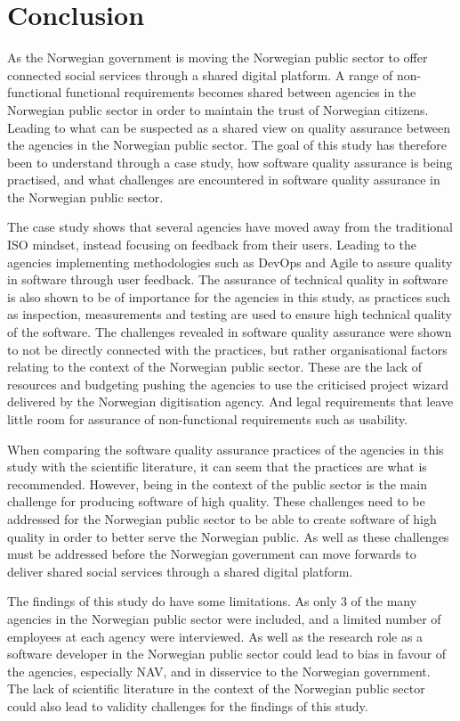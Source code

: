 \chapter{Conclusion} \label{sec:conclusion}
As the Norwegian government is moving the Norwegian public sector to offer connected social services through a shared digital platform. A range of non-functional functional requirements becomes shared between agencies in the Norwegian public sector in order to maintain the trust of Norwegian citizens. Leading to what can be suspected as a shared view on quality assurance between the agencies in the Norwegian public sector. The goal of this study has therefore been to understand through a case study, how software quality assurance is being practised, and what challenges are encountered in software quality assurance in the Norwegian public sector.

The case study shows that several agencies have moved away from the traditional ISO mindset, instead focusing on feedback from their users. Leading to the agencies implementing methodologies such as DevOps and Agile to assure quality in software through user feedback. The assurance of technical quality in software is also shown to be of importance for the agencies in this study, as practices such as inspection, measurements and testing are used to ensure high technical quality of the software. The challenges revealed in software quality assurance were shown to not be directly connected with the practices, but rather organisational factors relating to the context of the Norwegian public sector. These are the lack of resources and budgeting pushing the agencies to use the criticised project wizard delivered by the Norwegian digitisation agency. And legal requirements that leave little room for assurance of non-functional requirements such as usability.

When comparing the software quality assurance practices of the agencies in this study with the scientific literature, it can seem that the practices are what is recommended. However, being in the context of the public sector is the main challenge for producing software of high quality. These challenges need to be addressed for the Norwegian public sector to be able to create software of high quality in order to better serve the Norwegian public. As well as these challenges must be addressed before the Norwegian government can move forwards to deliver shared social services through a shared digital platform.

The findings of this study do have some limitations. As only 3 of the many agencies in the Norwegian public sector were included, and a limited number of employees at each agency were interviewed. As well as the research role as a software developer in the Norwegian public sector could lead to bias in favour of the agencies, especially NAV, and in disservice to the Norwegian government. The lack of scientific literature in the context of the Norwegian public sector could also lead to validity challenges for the findings of this study.

